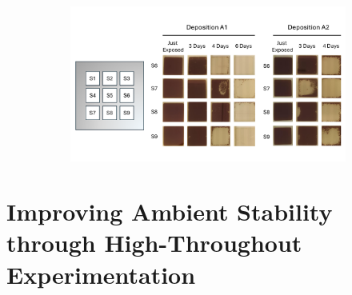 \begin{figure}[htbp]
    \centering
    \begin{subfigure}[t]{0.99\textwidth}
        \centering
        \includegraphics[width=\textwidth]{chapters/stability/imeges/Stability_Rotation_Repeatability.pdf} %
    \end{subfigure}
    \caption{}
    \label{}
\end{figure}



\section{Improving Ambient Stability through High-Throughout Experimentation}


